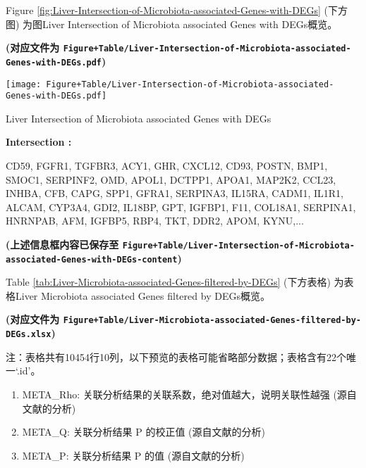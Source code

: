 \documentclass[
]{article}
\providecommand{\tightlist}{%
  \setlength{\itemsep}{0pt}\setlength{\parskip}{0pt}}
\begin{document}
Figure \ref{fig:Liver-Intersection-of-Microbiota-associated-Genes-with-DEGs} (下方图) 为图Liver Intersection of Microbiota associated Genes with DEGs概览。

\textbf{(对应文件为 \texttt{Figure+Table/Liver-Intersection-of-Microbiota-associated-Genes-with-DEGs.pdf})}

\def\@captype{figure}
\begin{center}
\texttt{[image: Figure+Table/Liver-Intersection-of-Microbiota-associated-Genes-with-DEGs.pdf]}
\caption{Liver Intersection of Microbiota associated Genes with DEGs}\label{fig:Liver-Intersection-of-Microbiota-associated-Genes-with-DEGs}
\end{center}
\begin{center}\begin{tcolorbox}[colback=gray!10, colframe=gray!50, width=0.9\linewidth, arc=1mm, boxrule=0.5pt]
\textbf{
Intersection
:}

\vspace{0.5em}

    CD59, FGFR1, TGFBR3, ACY1, GHR, CXCL12, CD93, POSTN,
BMP1, SMOC1, SERPINF2, OMD, APOL1, DCTPP1, APOA1, MAP2K2,
CCL23, INHBA, CFB, CAPG, SPP1, GFRA1, SERPINA3, IL15RA,
CADM1, IL1R1, ALCAM, CYP3A4, GDI2, IL18BP, GPT, IGFBP1,
F11, COL18A1, SERPINA1, HNRNPAB, AFM, IGFBP5, RBP4, TKT,
DDR2, APOM, KYNU,...

\vspace{2em}
\end{tcolorbox}
\end{center}

\textbf{(上述信息框内容已保存至 \texttt{Figure+Table/Liver-Intersection-of-Microbiota-associated-Genes-with-DEGs-content})}

Table \ref{tab:Liver-Microbiota-associated-Genes-filtered-by-DEGs} (下方表格) 为表格Liver Microbiota associated Genes filtered by DEGs概览。

\textbf{(对应文件为 \texttt{Figure+Table/Liver-Microbiota-associated-Genes-filtered-by-DEGs.xlsx})}

\begin{center}\begin{tcolorbox}[colback=gray!10, colframe=gray!50, width=0.9\linewidth, arc=1mm, boxrule=0.5pt]注：表格共有10454行10列，以下预览的表格可能省略部分数据；表格含有22个唯一`.id'。
\end{tcolorbox}
\end{center}
\begin{center}\begin{tcolorbox}[colback=gray!10, colframe=gray!50, width=0.9\linewidth, arc=1mm, boxrule=0.5pt]\begin{enumerate}\tightlist
\item META\_Rho:  关联分析结果的关联系数，绝对值越大，说明关联性越强 (源自文献的分析)
\item META\_Q:  关联分析结果 P 的校正值 (源自文献的分析)
\item META\_P:  关联分析结果 P 的值 (源自文献的分析)
\end{enumerate}\end{tcolorbox}
\end{center}
\end{document}
